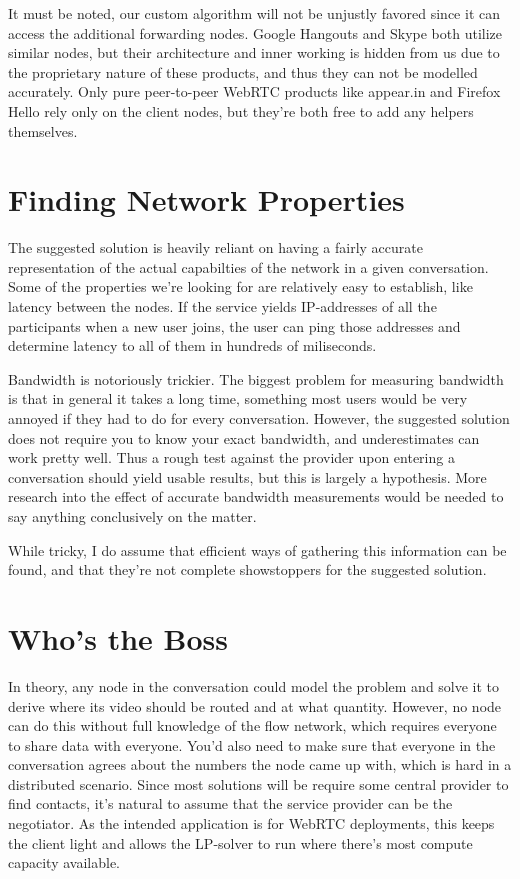 It must be noted, our custom algorithm will not be unjustly favored since it can access the additional forwarding nodes. Google Hangouts and Skype both utilize similar nodes, but their architecture and inner working is hidden from us due to the proprietary nature of these products, and thus they can not be modelled accurately. Only pure peer-to-peer WebRTC products like appear.in and Firefox Hello rely only on the client nodes, but they're both free to add any helpers themselves.


\section{Finding Network Properties}

The suggested solution is heavily reliant on having a fairly accurate representation of the actual capabilties of the network in a given conversation. Some of the properties we're looking for are relatively easy to establish, like latency between the nodes. If the service yields IP-addresses of all the participants when a new user joins, the user can ping those addresses and determine latency to all of them in hundreds of miliseconds.

Bandwidth is notoriously trickier. The biggest problem for measuring bandwidth is that in general it takes a long time, something most users would be very annoyed if they had to do for every conversation. However, the suggested solution does not require you to know your exact bandwidth, and underestimates can work pretty well. Thus a rough test against the provider upon entering a conversation should yield usable results, but this is largely a hypothesis. More research into the effect of accurate bandwidth measurements would be needed to say anything conclusively on the matter.

While tricky, I do assume that efficient ways of gathering this information can be found, and that they're not complete showstoppers for the suggested solution.


\section{Who's the Boss}

In theory, any node in the conversation could model the problem and solve it to derive where its video should be routed and at what quantity. However, no node can do this without full knowledge of the flow network, which requires everyone to share data with everyone. You'd also need to make sure that everyone in the conversation agrees about the numbers the node came up with, which is hard in a distributed scenario. Since most solutions will be require some central provider to find contacts, it's natural to assume that the service provider can be the negotiator. As the intended application is for WebRTC deployments, this keeps the client light and allows the LP-solver to run where there's most compute capacity available.

